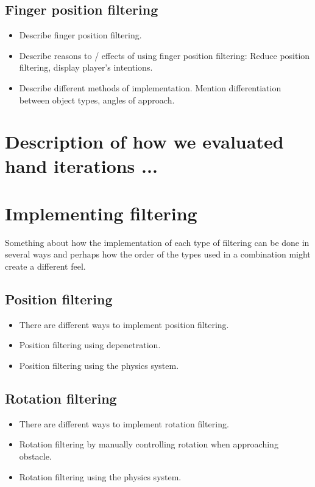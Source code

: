 
\subsection{Finger position filtering}
\label{subsec:categoryFingerFiltering}
\begin{itemize}
\item Describe finger position filtering.
\item Describe reasons to / effects of using finger position filtering: Reduce position filtering, display player's intentions.
\item Describe different methods of implementation. Mention differentiation between object types, angles of approach.
\end{itemize}


\section{Description of how we evaluated hand iterations ...}
\label{sec:DESCRIPTIONOFEVALUATIONSCENARIOS}

\section{Implementing filtering}
\label{sec:implementingFiltering}
Something about how the implementation of each type of filtering can be done in several ways and perhaps how the order of the types used in a combination might create a different feel.

\subsection{Position filtering}
\label{subsec:implementationPositionFiltering}
\begin{itemize}
\item There are different ways to implement position filtering.
\item Position filtering using depenetration.
\item Position filtering using the physics system.
\end{itemize}

\subsection{Rotation filtering}
\label{subsec:implementationRotationFiltering}
\begin{itemize}
\item There are different ways to implement rotation filtering.
\item Rotation filtering by manually controlling rotation when approaching obstacle.
\item Rotation filtering using the physics system.
\end{itemize}

